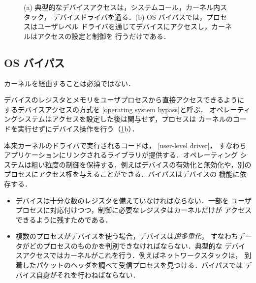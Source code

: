 \documentclass[../main.tex]{subfiles}
\begin{document}
\begin{figure}[htbp]
  \centering
  
  \caption{(a) 典型的なデバイスアクセスは，システムコール，カーネル内スタック，
    デバイスドライバを通る．(b) OS バイパスでは，プロセスはユーザレベル
    ドライバを通じてデバイスにアクセスし，カーネルはアクセスの設定と制御を
    行うだけである．}
  \label{fig:l11-access}
\end{figure}

\subsection{OS バイパス}

カーネルを経由することは必須ではない．

\begin{definition}[OS バイパス]
  デバイスのレジスタとメモリをユーザプロセスから直接アクセスできるように
  するデバイスアクセスの方式を
  [operating system bypass]と呼ぶ．
  オペレーティングシステムはアクセスを設定した後は関与せず，プロセスは
  カーネルのコードを実行せずにデバイス操作を行う（\cref{fig:l11-access}b）．
\end{definition}

本来カーネルのドライバで実行されるコードは，
[user-level driver]，
すなわちアプリケーションにリンクされるライブラリが提供する．オペレーティング
システムは粗い粒度の制御を保持する．例えばデバイスの有効化と無効化や，別の
プロセスにアクセス権を与えることができる．バイパスはデバイスの
機能に依存する．
\begin{itemize}
  \item デバイスは十分な数のレジスタを備えていなければならない．一部を
    ユーザプロセスに対応付けつつ，制御に必要なレジスタはカーネルだけが
    アクセスできるように残すためである．
  \item 複数のプロセスがデバイスを使う場合，デバイスは\emph{逆多重化}，
    すなわちデータがどのプロセスのものかを判別できなければならない．典型的な
    デバイスアクセスではカーネルがこれを行う．例えばネットワークスタックは，
    到着したパケットのヘッダを調べて受信プロセスを見つける．バイパスでは
    デバイス自身がそれを行わねばならない．
\end{itemize}
\end{document}
